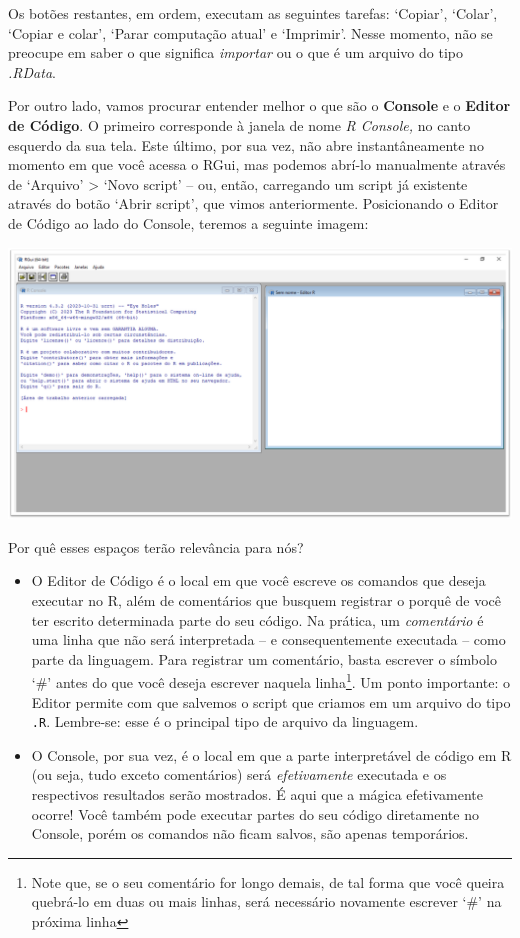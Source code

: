 \documentclass[
  letterpaper,
  DIV=11,
  numbers=noendperiod]{scrreprt}
\begin{document}
Os botões restantes, em ordem, executam as seguintes tarefas: `Copiar',
`Colar', `Copiar e colar', `Parar computação atual' e `Imprimir'. Nesse
momento, não se preocupe em saber o que significa \emph{importar} ou o
que é um arquivo do tipo \emph{.RData}.

Por outro lado, vamos procurar entender melhor o que são o
\textbf{Console} e o \textbf{Editor de Código}. O primeiro corresponde à
janela de nome \emph{R Console,} no canto esquerdo da sua tela. Este
último, por sua vez, não abre instantâneamente no momento em que você
acessa o RGui, mas podemos abrí-lo manualmente através de `Arquivo'
\textgreater{} `Novo script' -- ou, então, carregando um script já
existente através do botão `Abrir script', que vimos anteriormente.
Posicionando o Editor de Código ao lado do Console, teremos a seguinte
imagem:

\begin{center}
\includegraphics{images/clipboard-1401293353.png}
\end{center}

Por quê esses espaços terão relevância para nós?

\begin{itemize}
\item
  O Editor de Código é o local em que você escreve os comandos que
  deseja executar no R, além de comentários que busquem registrar o
  porquê de você ter escrito determinada parte do seu código. Na
  prática, um \emph{comentário} é uma linha que não será interpretada --
  e consequentemente executada -- como parte da linguagem. Para
  registrar um comentário, basta escrever o símbolo `\#' antes do que
  você deseja escrever naquela linha\footnote{Note que, se o seu
    comentário for longo demais, de tal forma que você queira quebrá-lo
    em duas ou mais linhas, será necessário novamente escrever `\#' na
    próxima linha}. Um ponto importante: o Editor permite com que
  salvemos o script que criamos em um arquivo do tipo \texttt{.R}.
  Lembre-se: esse é o principal tipo de arquivo da linguagem.
\item
  O Console, por sua vez, é o local em que a parte interpretável de
  código em R (ou seja, tudo exceto comentários) será
  \emph{efetivamente} executada e os respectivos resultados serão
  mostrados. É aqui que a mágica efetivamente ocorre! Você também pode
  executar partes do seu código diretamente no Console, porém os
  comandos não ficam salvos, são apenas temporários.
\end{itemize}
\end{document}
